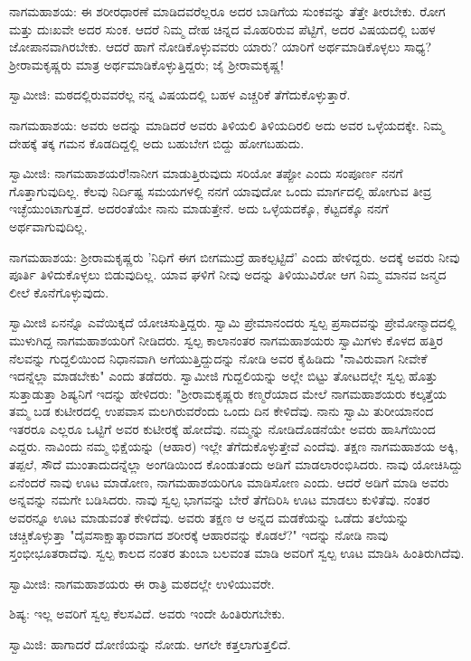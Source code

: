 ನಾಗಮಹಾಶಯ: ಈ ಶರೀರಧಾರಣೆ ಮಾಡಿದವರೆಲ್ಲರೂ ಅದರ ಬಾಡಿಗೆಯ ಸುಂಕವನ್ನು ತೆತ್ತೇ ತೀರಬೇಕು. ರೋಗ ಮತ್ತು ದುಃಖವೇ ಅದರ ಸುಂಕ. ಆದರೆ ನಿಮ್ಮ ದೇಹ ಚಿನ್ನದ ಮೊಹರಿರುವ ಪೆಟ್ಟಿಗೆ, ಅದರ ವಿಷಯದಲ್ಲಿ ಬಹಳ ಜೋಪಾನವಾಗಿರಬೇಕು. ಆದರೆ ಹಾಗೆ ನೋಡಿಕೊಳ್ಳುವವರು ಯಾರು? ಯಾರಿಗೆ ಅರ್ಥಮಾಡಿಕೊಳ್ಳಲು ಸಾಧ್ಯ? ಶ‍್ರೀರಾಮಕೃಷ್ಣರು ಮಾತ್ರ ಅರ್ಥಮಾಡಿಕೊಳ್ಳುತ್ತಿದ್ದರು; ಜೈ ಶ‍್ರೀರಾಮಕೃಷ್ಣ!

ಸ್ವಾಮೀಜಿ: ಮಠದಲ್ಲಿರುವವರೆಲ್ಲ ನನ್ನ ವಿಷಯದಲ್ಲಿ ಬಹಳ ಎಚ್ಚರಿಕೆ ತೆಗೆದುಕೊಳ್ಳುತ್ತಾರೆ.

ನಾಗಮಹಾಶಯ: ಅವರು ಅದನ್ನು ಮಾಡಿದರೆ ಅವರು ತಿಳಿಯಲಿ ತಿಳಿಯದಿರಲಿ ಅದು ಅವರ ಒಳ್ಳೆಯದಕ್ಕೇ. ನಿಮ್ಮ ದೇಹಕ್ಕೆ ತಕ್ಕ ಗಮನ ಕೊಡದಿದ್ದಲ್ಲಿ ಅದು ಬಹುಬೇಗ ಬಿದ್ದು ಹೋಗಬಹುದು.

ಸ್ವಾಮೀಜಿ: ನಾಗಮಹಾಶಯರೆ!ನಾನೀಗ ಮಾಡುತ್ತಿರುವುದು ಸರಿಯೋ ತಪ್ಪೋ ಎಂದು ಸಂಪೂರ್ಣ ನನಗೆ ಗೊತ್ತಾಗುವುದಿಲ್ಲ. ಕೆಲವು ನಿರ್ದಿಷ್ಟ ಸಮಯಗಳಲ್ಲಿ ನನಗೆ ಯಾವುದೋ ಒಂದು ಮಾರ್ಗದಲ್ಲಿ ಹೋಗುವ ತೀವ್ರ ಇಚ್ಛೆಯುಂಟಾಗುತ್ತದೆ. ಅದರಂತೆಯೇ ನಾನು ಮಾಡುತ್ತೇನೆ. ಅದು ಒಳ್ಳೆಯದಕ್ಕೊ, ಕೆಟ್ಟದಕ್ಕೊ ನನಗೆ ಅರ್ಥವಾಗುವುದಿಲ್ಲ.

ನಾಗಮಹಾಶಯ: ಶ‍್ರೀರಾಮಕೃಷ್ಣರು 'ನಿಧಿಗೆ ಈಗ ಬೀಗಮುದ್ರೆ ಹಾಕಲ್ಪಟ್ಟಿದೆ' ಎಂದು ಹೇಳಿದ್ದರು. ಅದಕ್ಕೆ ಅವರು ನೀವು ಪೂರ್ತಿ ತಿಳಿದುಕೊಳ್ಳಲು ಬಿಡುವುದಿಲ್ಲ. ಯಾವ ಘಳಿಗೆ ನೀವು ಅದನ್ನು ತಿಳಿಯುವಿರೋ ಆಗ ನಿಮ್ಮ ಮಾನವ ಜನ್ಮದ ಲೀಲೆ ಕೊನೆಗೊಳ್ಳುವುದು.

ಸ್ವಾಮೀಜಿ ಏನನ್ನೊ ಎವೆಯಿಕ್ಕದೆ ಯೋಚಿಸುತ್ತಿದ್ದರು. ಸ್ವಾಮಿ ಪ್ರೇಮಾನಂದರು ಸ್ವಲ್ಪ ಪ್ರಸಾದವನ್ನು ಪ್ರೇಮೋನ್ಮಾದದಲ್ಲಿ ಮುಳುಗಿದ್ದ ನಾಗಮಹಾಶಯರಿಗೆ ನೀಡಿದರು. ಸ್ವಲ್ಪ ಕಾಲಾನಂತರ ನಾಗಮಹಾಶಯರು ಸ್ವಾಮಿಗಳು ಕೊಳದ ಹತ್ತಿರ ನೆಲವನ್ನು ಗುದ್ದಲಿಯಿಂದ ನಿಧಾನವಾಗಿ ಅಗೆಯುತ್ತಿದ್ದುದನ್ನು ನೋಡಿ ಅವರ ಕೈಹಿಡಿದು "ನಾವಿರುವಾಗ ನೀವೇಕೆ ಇದನ್ನೆಲ್ಲಾ ಮಾಡಬೇಕು" ಎಂದು ತಡೆದರು. ಸ್ವಾಮೀಜಿ ಗುದ್ದಲಿಯನ್ನು ಅಲ್ಲೇ ಬಿಟ್ಟು ತೋಟದಲ್ಲೇ ಸ್ವಲ್ಪ ಹೊತ್ತು ಸುತ್ತಾಡುತ್ತಾ ಶಿಷ್ಯನಿಗೆ ಇದನ್ನು ಹೇಳಿದರು: "ಶ‍್ರೀರಾಮಕೃಷ್ಣರು ಕಣ್ಮರೆಯಾದ ಮೇಲೆ ನಾಗಮಹಾಶಯರು ಕಲ್ಕತ್ತೆಯ ತಮ್ಮ ಬಡ ಕುಟೀರದಲ್ಲಿ ಉಪವಾಸ ಮಲಗಿರುವರೆಂದು ಒಂದು ದಿನ ಕೇಳಿದೆವು. ನಾನು ಸ್ವಾಮಿ ತುರೀಯಾನಂದ ಇತರರೂ ಎಲ್ಲರೂ ಒಟ್ಟಿಗೆ ಅವರ ಕುಟೀರಕ್ಕೆ ಹೋದೆವು. ನಮ್ಮನ್ನು ನೋಡಿದೊಡನೆಯೇ ಅವರು ಹಾಸಿಗೆಯಿಂದ ಎದ್ದರು. ನಾವಿಂದು ನಮ್ಮ ಭಿಕ್ಷೆಯನ್ನು (ಆಹಾರ) ಇಲ್ಲೇ ತೆಗೆದುಕೊಳ್ಳುತ್ತೇವೆ ಎಂದೆವು. ತಕ್ಷಣ ನಾಗಮಹಾಶಯ ಅಕ್ಕಿ, ತಪ್ಪಲೆ, ಸೌದೆ ಮುಂತಾದುದನ್ನೆಲ್ಲಾ ಅಂಗಡಿಯಿಂದ ಕೊಂಡುತಂದು ಅಡಿಗೆ ಮಾಡಲಾರಂಭಿಸಿದರು. ನಾವು ಯೋಚಿಸಿದ್ದು ಏನೆಂದರೆ ನಾವು ಊಟ ಮಾಡೋಣ, ನಾಗಮಹಾಶಯರಿಗೂ ಮಾಡಿಸೋಣ ಎಂದು. ಆದರೆ ಅಡಿಗೆ ಮಾಡಿ ಅವರು ಅನ್ನವನ್ನು ನಮಗೇ ಬಡಿಸಿದರು. ನಾವು ಸ್ವಲ್ಪ ಭಾಗವನ್ನು ಬೇರೆ ತೆಗೆದಿರಿಸಿ ಊಟ ಮಾಡಲು ಕುಳಿತೆವು. ನಂತರ ಅವರನ್ನೂ ಊಟ ಮಾಡುವಂತೆ ಕೇಳಿದೆವು. ಅವರು ತಕ್ಷಣ ಆ ಅನ್ನದ ಮಡಕೆಯನ್ನು ಒಡೆದು ತಲೆಯನ್ನು ಚಚ್ಚಿಕೊಳ್ಳುತ್ತಾ "ದೈವಸಾಕ್ಷಾತ್ಕಾರವಾಗದ ಶರೀರಕ್ಕೆ ಆಹಾರವನ್ನು ಕೊಡಲೆ?" ಇದನ್ನು ನೋಡಿ ನಾವು ಸ್ತಂಭೀಭೂತರಾದೆವು. ಸ್ವಲ್ಪ ಕಾಲದ ನಂತರ ತುಂಬಾ ಬಲವಂತ ಮಾಡಿ ಅವರಿಗೆ ಸ್ವಲ್ಪ ಊಟ ಮಾಡಿಸಿ ಹಿಂತಿರುಗಿದೆವು.

ಸ್ವಾಮೀಜಿ: ನಾಗಮಹಾಶಯರು ಈ ರಾತ್ರಿ ಮಠದಲ್ಲೇ ಉಳಿಯುವರೇ.

ಶಿಷ್ಯ: ಇಲ್ಲ ಅವರಿಗೆ ಸ್ವಲ್ಪ ಕೆಲಸವಿದೆ. ಅವರು ಇಂದೇ ಹಿಂತಿರುಗಬೇಕು.

ಸ್ವಾಮಿಜಿ: ಹಾಗಾದರೆ ದೋಣಿಯನ್ನು ನೋಡು. ಆಗಲೇ ಕತ್ತಲಾಗುತ್ತಲಿದೆ.

